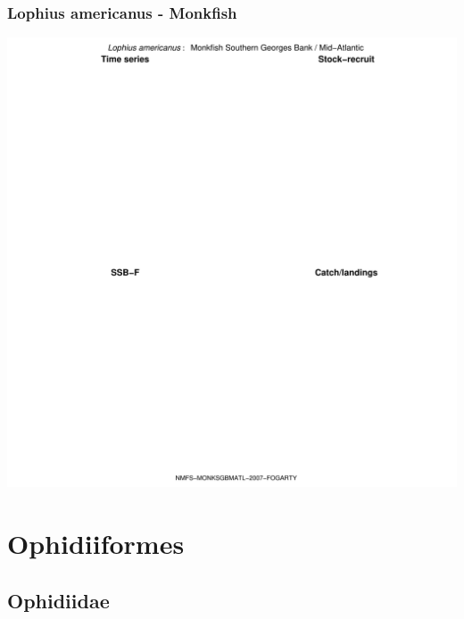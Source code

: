 \subsubsection{Lophius americanus - Monkfish}
\begin{center}
\includegraphics[width=1.2\textwidth]{../R/figures/NMFS-MONKSGBMATL-2007-FOGARTY.pdf}
\end{center}

\section{Ophidiiformes}

\subsection{Ophidiidae}

